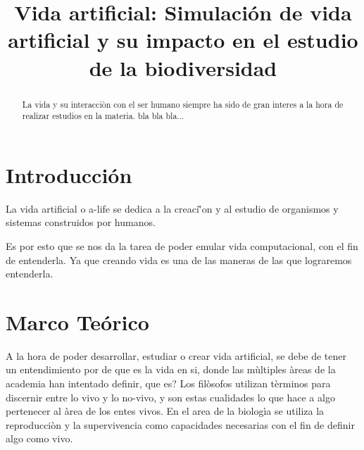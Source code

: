 \documentclass[conference]{IEEEtran}
\begin{document}
 

\title{Vida artificial: Simulaci\'on de vida artificial y su impacto en el estudio de la biodiversidad }



\author{

}


\maketitle


\begin{abstract}
La vida y su interacci\`on con el ser humano siempre ha sido de gran interes a la hora de realizar estudios en la materia. 
bla bla bla... 



\end{abstract}

\section{Introducci\'on}

La vida artificial o a-life se dedica a la creaci\`'on y al estudio de organismos y sistemas construidos por humanos. \cite{artificiallifeLevy} 

Es por esto que se nos da la tarea de poder emular vida computacional, con el fin de entenderla. Ya que creando vida es una de las maneras de las que lograremos entenderla. \cite{artificiallifeLevy}  

\section{Marco Te\'orico}



A la hora de poder desarrollar, estudiar o crear vida artificial, se debe de tener un entendimiento por de que es la vida en si, donde las m\`ultiples \`areas de la academia han intentado definir, que es? Los fil\`osofos utilizan t\`erminos para discernir entre lo vivo y lo no-vivo, y son estas cualidades lo que hace a algo pertenecer al \`area de los entes vivos. \cite{lifeStanfordPhi} En el area de la biolog\`ia se utiliza la reproducci\`on y la supervivencia \cite{artificiallifeLevy} como capacidades necesarias con el fin de definir algo como vivo. 
\end{document}
